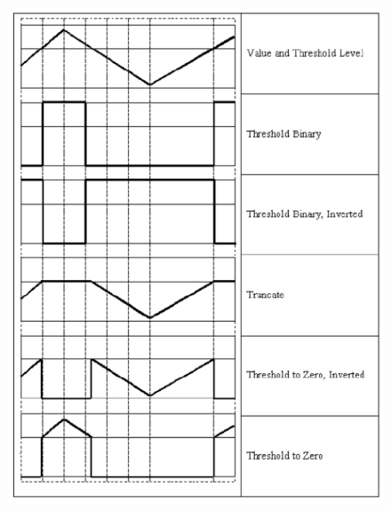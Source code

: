 \documentclass{article}
\begin{document}
\begin{figure}[htbp]
\centerline{\includegraphics[width=5.55in,height=7.32in]{User4.pdf}}
\label{fig4}
\end{figure}
\end{document}
